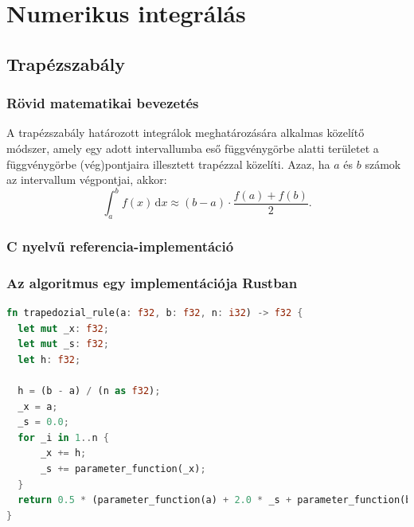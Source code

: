 
\section{Numerikus integrálás}

\subsection{Trapézszabály}

\subsubsection{Rövid matematikai bevezetés}

A trapézszabály határozott integrálok meghatározására alkalmas közelítő módszer, amely egy adott intervallumba eső függvénygörbe alatti területet a függvénygörbe (vég)pontjaira illesztett trapézzal közelíti. Azaz, ha $a$ és $b$ számok az intervallum végpontjai, akkor:
\[
\int_{a}^{b} \! f(x) \, \textrm{d} x \approx (b - a) \cdot \frac{f(a) + f(b)}{2}.
\]

\subsubsection{C nyelvű referencia-implementáció}


\subsubsection{Az algoritmus egy implementációja Rustban}

\begin{lstlisting}[language=Rust, style=boxed]
fn trapedozial_rule(a: f32, b: f32, n: i32) -> f32 {
  let mut _x: f32;
  let mut _s: f32;
  let h: f32;
  
  h = (b - a) / (n as f32);
  _x = a;
  _s = 0.0;
  for _i in 1..n {
      _x += h;
      _s += parameter_function(_x);
  }
  return 0.5 * (parameter_function(a) + 2.0 * _s + parameter_function(b));
}
\end{lstlisting}

